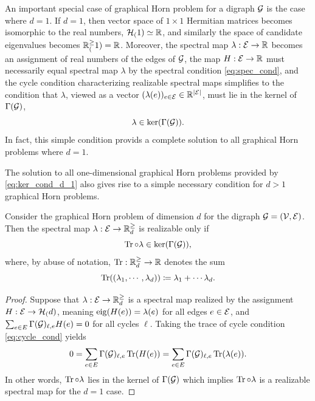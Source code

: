 \documentclass[notitlepage, 10pt]{article}
\begin{document}
\begin{exam}
    An important special case of graphical Horn problem for a digraph $\mathcal G$ is the case where $d = 1$.
    If $d=1$, then vector space of $1\times 1$ Hermitian matrices becomes isomorphic to the real numbers, $\mathcal H_{(}1) \simeq \mathbb R$, and similarly the space of candidate eigenvalues becomes $\mathbb R^{\geq}_{(}1) = \mathbb R$.
    Moreover, the spectral map $\lambda : \mathcal E \to \mathbb R$ becomes an assignment of real numbers of the edges of $\mathcal G$, the map $H : \mathcal E \to \mathbb R$ must necessarily equal spectral map $\lambda$ by the spectral condition \cref{eq:spec_cond}, and the cycle condition characterizing realizable spectral maps simplifies to the condition that $\lambda$, viewed as a vector $(\lambda(e))_{e \in \mathcal E} \in \mathbb R^{\left|\mathcal E\right|}$, must lie in the kernel of $\Gamma(\mathcal G)$,
    \begin{equation}
        \label{eq:ker_cond_d_1}
        \lambda \in \ker(\Gamma(\mathcal G)).
    \end{equation}
    In fact, this simple condition provids a complete solution to all graphical Horn problems where $d=1$.
\end{exam}

The solution to all one-dimensional graphical Horn problems provided by \cref{eq:ker_cond_d_1} also gives rise to a simple necessary condition for $d>1$ graphical Horn problems.
\begin{lem}
    \label{lem:trace_cond}
    Consider the graphical Horn problem of dimension $d$ for the digraph $\mathcal G = (\mathcal V, \mathcal E)$.
    Then the spectral map $\lambda : \mathcal E \to \mathbb R^{\geq}_{d}$ is realizable only if 
    \begin{equation}
        \operatorname{Tr} \circ \lambda \in \ker(\Gamma(\mathcal G)),
    \end{equation}
    where, by abuse of notation, $\operatorname{Tr} : \mathbb R^{\geq}_{d} \to \mathbb R$ denotes the sum 
    \begin{equation}
        \operatorname{Tr}((\lambda_1, \cdots, \lambda_d)) \coloneqq \lambda_1 + \cdots \lambda_d.
    \end{equation}
\end{lem}
\begin{proof}
    Suppose that $\lambda : \mathcal E \to \mathbb R^{\geq}_{d}$ is a spectral map realized by the assignment $H : \mathcal E \to \mathcal H_{(}d)$, meaning $\operatorname{eig}(H(e)) = \lambda(e)$ for all edges $e \in \mathcal E$, and $\sum_{e\in E}\Gamma(\mathcal G)_{\ell, e}H(e) = 0$ for all cycles $\ell$.
    Taking the trace of cycle condition \cref{eq:cycle_cond} yields
    \begin{equation}
        0 = \sum_{e\in E}\Gamma(\mathcal G)_{\ell, e}\operatorname{Tr}(H(e)) = \sum_{e\in E}\Gamma(\mathcal G)_{\ell, e}\operatorname{Tr}(\lambda(e)).
    \end{equation}
    In other words, $\operatorname{Tr} \circ \lambda$ lies in the kernel of $\Gamma(\mathcal G)$ which implies $\operatorname{Tr} \circ \lambda$ is a realizable spectral map for the $d=1$ case.
\end{proof}
\end{document}

